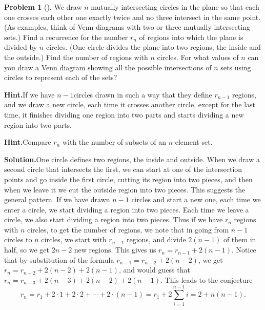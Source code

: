 \documentclass[10pt,]{book}
\theoremstyle{plain}
\theoremstyle{definition}
\newtheorem{activity}[project]{Problem}
\theoremstyle{definition}
\numberwithin{equation}{chapter}
\begin{document}
\begin{activity}[]\label{circlesinplane}
We draw \(n\) mutually intersecting circles in the plane so that each one crosses each other one exactly twice and no three intersect in the same point. (As examples, think of Venn diagrams with two or three mutually intersecting sets.) Find a recurrence for the number \(r_n\) of regions into which the plane is divided by \(n\) circles. (One circle divides the plane into two regions, the inside and the outside.) Find the number of regions with \(n\) circles. For what values of \(n\) can you draw a Venn diagram showing all the possible intersections of \(n\) sets using circles to represent each of the sets?%
\par\medskip\noindent%
\textbf{Hint.}\quad If we have \(n - 1\)circles drawn in such a way that they define \(r_{n-1}\) regions, and we draw a new circle, each time it crosses another circle, except for the last time, it finishes dividing one region into two parts and starts dividing a new region into two parts.%
\par\medskip\noindent%
\textbf{Hint.}\quad Compare \(r_n\) with the number of subsets of an \(n\)-element set.%
\par\medskip\noindent%
\textbf{Solution.}\quad One circle defines two regions, the inside and outside. When we draw a second circle that intersects the first, we can start at one of the intersection points and go inside the first circle, cutting its region into two pieces, and then when we leave it we cut the outside region into two pieces. This suggests the general pattern. If we have drawn \(n-1\) circles and start a new one, each time we enter a circle, we start dividing a region into two pieces. Each time we leave a circle, we also start dividing a region into two pieces. Thus if we have \(r_n\) regions with \(n\) circles, to get the number of regions, we note that in going from \(n-1\) circles to \(n\) circles, we start with \(r_{n-1}\) regions, and divide \(2(n-1)\) of them in half, so we get \(2n-2\) new regions. This gives us \(r_n=r_{n-1}+2(n-1)\). Notice that by substitution of the formula \(r_{n-1}=r_{n-2} +2(n-2)\), we get \(r_n=r_{n-2}+ 2(n-2)
+2(n-1)\), and would guess that \(r_n=r_{n-3}+2(n-3)+2(n-2) +2(n-1)\). This leads to the conjecture%
\begin{equation*}
r_n=r_1  +2\cdot1+2\cdot2+\cdots+2\cdot(n-1)=r_1+2\sum_{i=1}^{n-1}
i=2+n(n-1).
\end{equation*}
%
\par

\end{activity}
\end{document}
